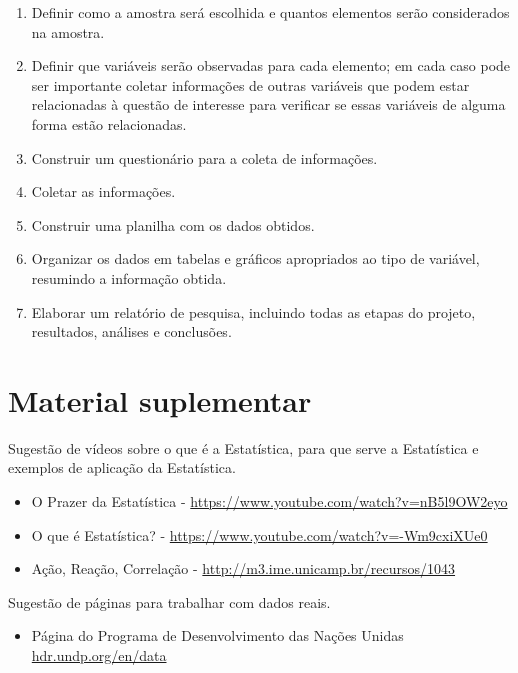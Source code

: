 {{\begin{enumerate}
\item {} 
Definir como a amostra será escolhida e quantos elementos serão considerados na amostra.

\item {} 
Definir que variáveis serão observadas para cada elemento; em cada caso pode ser importante coletar informações de outras variáveis que podem estar relacionadas à questão de interesse para verificar se essas variáveis de alguma forma estão relacionadas.

\item {} 
Construir um questionário para a coleta de informações.

\item {} 
Coletar as informações.

\item {} 
Construir uma planilha com os dados obtidos.

\item {} 
Organizar os dados em tabelas e gráficos apropriados ao tipo de variável, resumindo a informação obtida.

\item {} 
Elaborar um relatório de pesquisa, incluindo todas as etapas do projeto, resultados, análises e conclusões.

\end{enumerate}


\section{Material suplementar}
\label{est1-suplementar-1}

Sugestão de vídeos sobre o que é a Estatística, para que serve a Estatística e exemplos de aplicação da Estatística.
\begin{itemize}
\item {} 
O Prazer da Estatística - \url{https://www.youtube.com/watch?v=nB5l9OW2eyo}

\item {} 
O que é Estatística? - \url{https://www.youtube.com/watch?v=-Wm9cxiXUe0}

\item {} 
Ação, Reação, Correlação - \url{http://m3.ime.unicamp.br/recursos/1043}

\end{itemize}

Sugestão de páginas para trabalhar com dados reais.
\begin{itemize}
\item {} 
Página do Programa de Desenvolvimento das Nações Unidas \textendash{} \url{hdr.undp.org/en/data}


\end{itemize}}}
